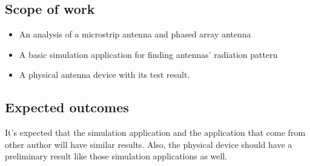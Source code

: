 \documentclass[11pt,a4paper]{article}
\begin{document}
    \subsection{Scope of work}
      \begin{itemize}
        \item An analysis of a microstrip antenna and phased array antenna
        \item A basic simulation application for finding antennas' radiation pattern
        \item A physical antenna device with its test result.
      \end{itemize}

    \subsection{Expected outcomes}
      \indent It's expected that the simulation application and the application that come from other author
      will have similar results. Also, the physical device should have a preliminary result like those simulation
      applications as well.
  
    \newpage

     
    
\end{document}
